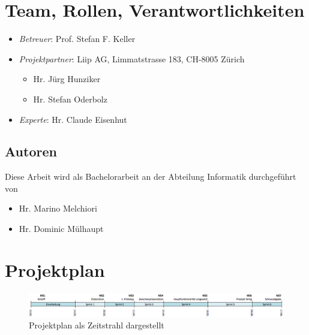 \section{Team, Rollen, Verantwortlichkeiten}
\label{pm-rollen}
\begin{itemize}
	\item \textit{Betreuer}: Prof. Stefan F. Keller
	\item \textit{Projektpartner}: Liip AG, Limmatstrasse 183, CH-8005 Zürich
	\begin{itemize}
		\item Hr. Jürg Hunziker
		\item Hr. Stefan Oderbolz
	\end{itemize}
	\item \textit{Experte}: Hr. Claude Eisenhut
\end{itemize}

\subsection*{Autoren}
Diese Arbeit wird als Bachelorarbeit an der Abteilung Informatik durchgeführt von
\begin{itemize}
	\item Hr. Marino Melchiori
	\item Hr. Dominic Mülhaupt
\end{itemize}




\section{Projektplan}
\begin{figure}[H]
	\centering
	\includegraphics[width=\textwidth]{images/projektmanagement/zeitstrahl.png}
	\caption{Projektplan als Zeitstrahl dargestellt}
	\label{image-project-plan-timeline}
\end{figure}

